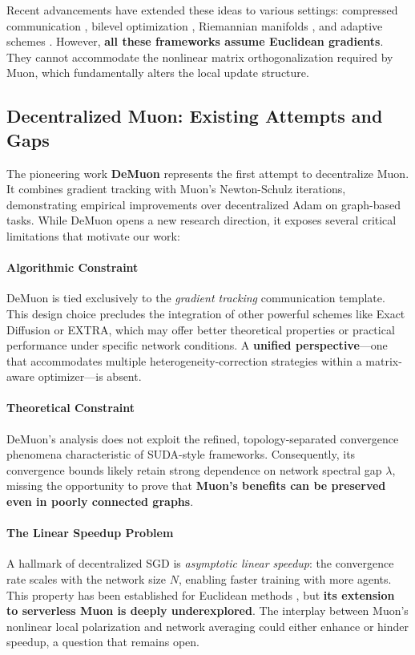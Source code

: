 Recent advancements have extended these ideas to various settings: compressed communication \cite{liao2022compressed, huang2023cedas}, bilevel optimization \cite{zhu2024sparkle}, Riemannian manifolds \cite{wu2025riemannian, chen2025quantized}, and adaptive schemes \cite{yuan2025achieving}. However, \textbf{all these frameworks assume Euclidean gradients}. They cannot accommodate the nonlinear matrix orthogonalization required by Muon, which fundamentally alters the local update structure.

\subsection{Decentralized Muon: Existing Attempts and Gaps}

The pioneering work \textbf{DeMuon} \cite{he2025demuon} represents the first attempt to decentralize Muon. It combines gradient tracking with Muon's Newton-Schulz iterations, demonstrating empirical improvements over decentralized Adam on graph-based tasks. While DeMuon opens a new research direction, it exposes several critical limitations that motivate our work:

\paragraph{Algorithmic Constraint} DeMuon is tied exclusively to the \emph{gradient tracking} communication template. This design choice precludes the integration of other powerful schemes like Exact Diffusion or EXTRA, which may offer better theoretical properties or practical performance under specific network conditions. A \textbf{unified perspective}---one that accommodates multiple heterogeneity-correction strategies within a matrix-aware optimizer---is absent.

\paragraph{Theoretical Constraint} DeMuon's analysis does not exploit the refined, topology-separated convergence phenomena characteristic of SUDA-style frameworks. Consequently, its convergence bounds likely retain strong dependence on network spectral gap $\lambda$, missing the opportunity to prove that \textbf{Muon's benefits can be preserved even in poorly connected graphs}.

\paragraph{The Linear Speedup Problem} A hallmark of decentralized SGD is \emph{asymptotic linear speedup}: the convergence rate scales with the network size $N$, enabling faster training with more agents. This property has been established for Euclidean methods \cite{yuan2025achieving}, but \textbf{its extension to serverless Muon is deeply underexplored}. The interplay between Muon's nonlinear local polarization and network averaging could either enhance or hinder speedup, a question that remains open.

